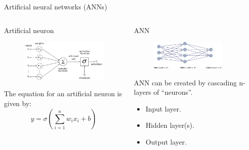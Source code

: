 \documentclass[10pt,aspectratio=169,dvipsnames]{beamer} %
\begin{document}
	\begin{frame}{Artificial neural networks (ANNs)}
		\begin{columns}[T]
			\begin{column}{.45\textwidth}
				\begin{block}{Artificial neuron}
					\begin{figure}
						\centering
						\includegraphics[width=.95\textwidth]{ArtificialNeuronModel.png}
					\end{figure}
				The equation for an artificial neuron is given by:
				\[
				y = \sigma\left(\sum_{i=1}^{n} w_i x_i + b\right)
				\]
				\end{block}
			\end{column}
			\begin{column}{0.55\textwidth}
				\begin{block}{ANN}
					\begin{figure}
						\centering
						\includegraphics[width=0.85\textwidth]{ANN.png}
					\end{figure}
					ANN can be created by cascading n-layers of “neurons”. 
					\begin{itemize}
						\item	Input layer.
						\item	Hidden layer(s).
						\item	Output layer.	
					\end{itemize}
				\end{block}
			\end{column}
		\end{columns}
	\end{frame}
\end{document}
